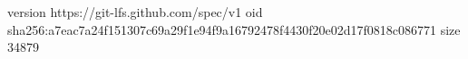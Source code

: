 version https://git-lfs.github.com/spec/v1
oid sha256:a7eac7a24f151307c69a29f1e94f9a16792478f4430f20e02d17f0818c086771
size 34879
